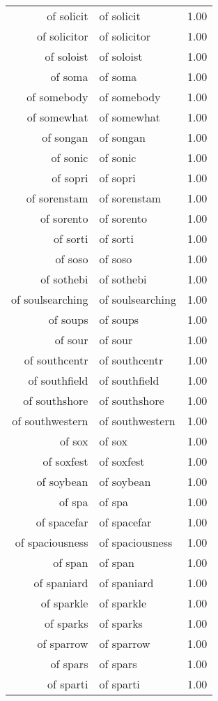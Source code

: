 \begin{table}[ht]
\begin{tabular}{rlr}
  of solicit & of solicit & 1.00 \\ 
  of solicitor & of solicitor & 1.00 \\ 
  of soloist & of soloist & 1.00 \\ 
  of soma & of soma & 1.00 \\ 
  of somebody & of somebody & 1.00 \\ 
  of somewhat & of somewhat & 1.00 \\ 
  of songan & of songan & 1.00 \\ 
  of sonic & of sonic & 1.00 \\ 
  of sopri & of sopri & 1.00 \\ 
  of sorenstam & of sorenstam & 1.00 \\ 
  of sorento & of sorento & 1.00 \\ 
  of sorti & of sorti & 1.00 \\ 
  of soso & of soso & 1.00 \\ 
  of sothebi & of sothebi & 1.00 \\ 
  of soulsearching & of soulsearching & 1.00 \\ 
  of soups & of soups & 1.00 \\ 
  of sour & of sour & 1.00 \\ 
  of southcentr & of southcentr & 1.00 \\ 
  of southfield & of southfield & 1.00 \\ 
  of southshore & of southshore & 1.00 \\ 
  of southwestern & of southwestern & 1.00 \\ 
  of sox & of sox & 1.00 \\ 
  of soxfest & of soxfest & 1.00 \\ 
  of soybean & of soybean & 1.00 \\ 
  of spa & of spa & 1.00 \\ 
  of spacefar & of spacefar & 1.00 \\ 
  of spaciousness & of spaciousness & 1.00 \\ 
  of span & of span & 1.00 \\ 
  of spaniard & of spaniard & 1.00 \\ 
  of sparkle & of sparkle & 1.00 \\ 
  of sparks & of sparks & 1.00 \\ 
  of sparrow & of sparrow & 1.00 \\ 
  of spars & of spars & 1.00 \\ 
  of sparti & of sparti & 1.00 \\ 

\end{tabular}
\end{table}
